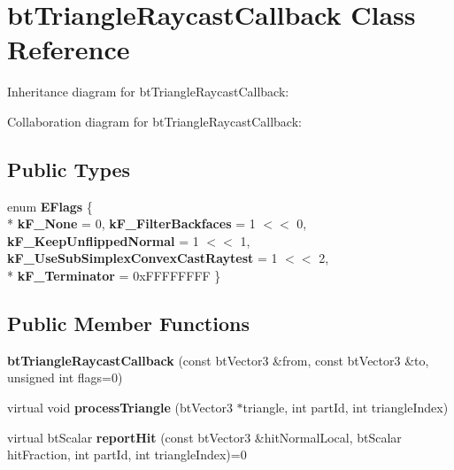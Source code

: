 \hypertarget{classbt_triangle_raycast_callback}{\section{bt\+Triangle\+Raycast\+Callback Class Reference}
\label{classbt_triangle_raycast_callback}
}


Inheritance diagram for bt\+Triangle\+Raycast\+Callback\+:


Collaboration diagram for bt\+Triangle\+Raycast\+Callback\+:
\subsection*{Public Types}
\begin{DoxyCompactItemize}
\item 
\hypertarget{classbt_triangle_raycast_callback_a561b385fd82b6b972fb6d206a42fc478}{enum {\bfseries E\+Flags} \{ \\*
{\bfseries k\+F\+\_\+\+None} = 0, 
{\bfseries k\+F\+\_\+\+Filter\+Backfaces} = 1 $<$$<$ 0, 
{\bfseries k\+F\+\_\+\+Keep\+Unflipped\+Normal} = 1 $<$$<$ 1, 
{\bfseries k\+F\+\_\+\+Use\+Sub\+Simplex\+Convex\+Cast\+Raytest} = 1 $<$$<$ 2, 
\\*
{\bfseries k\+F\+\_\+\+Terminator} = 0x\+F\+F\+F\+F\+F\+F\+F\+F
 \}}\label{classbt_triangle_raycast_callback_a561b385fd82b6b972fb6d206a42fc478}

\end{DoxyCompactItemize}
\subsection*{Public Member Functions}
\begin{DoxyCompactItemize}
\item 
\hypertarget{classbt_triangle_raycast_callback_acfd6e50b725eedde2c5054d877a679fc}{{\bfseries bt\+Triangle\+Raycast\+Callback} (const bt\+Vector3 \&from, const bt\+Vector3 \&to, unsigned int flags=0)}\label{classbt_triangle_raycast_callback_acfd6e50b725eedde2c5054d877a679fc}

\item 
\hypertarget{classbt_triangle_raycast_callback_abfa22cc0d4b842c1ad9566154f450f1d}{virtual void {\bfseries process\+Triangle} (bt\+Vector3 $\ast$triangle, int part\+Id, int triangle\+Index)}\label{classbt_triangle_raycast_callback_abfa22cc0d4b842c1ad9566154f450f1d}

\item 
\hypertarget{classbt_triangle_raycast_callback_ae586790c742393f3650261de3a87f738}{virtual bt\+Scalar {\bfseries report\+Hit} (const bt\+Vector3 \&hit\+Normal\+Local, bt\+Scalar hit\+Fraction, int part\+Id, int triangle\+Index)=0}\label{classbt_triangle_raycast_callback_ae586790c742393f3650261de3a87f738}

\end{DoxyCompactItemize}
